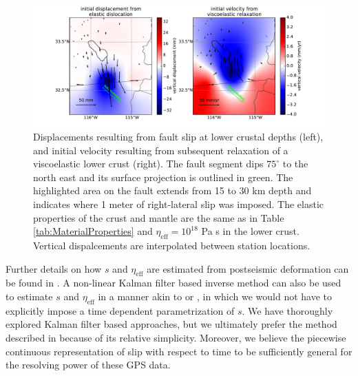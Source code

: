 \documentclass[review]{elsarticle}
\begin{document}
\begin{figure}
\includegraphics[scale=0.5]{Figures/Cancellation}
\caption{Displacements resulting from fault slip at lower crustal depths (left), and initial velocity resulting from subsequent relaxation of a viscoelastic lower crust (right).  The fault segment dips $75^\circ$ to the north east and its surface projection is outlined in green.  The highlighted area on the fault extends from 15 to 30 km depth and indicates where 1 meter of right-lateral slip was imposed.  The elastic properties of the crust and mantle are the same as in Table \ref{tab:MaterialProperties} and $\eta_\mathrm{eff}=10^{18}$ Pa s in the lower crust.  Vertical dispalcements are interpolated between station locations.}
\label{fig:LowerCrust}
\end{figure}
 
Further details on how $s$ and $\eta_\mathrm{eff}$ are estimated from postseismic deformation can be found in \citet{Hines2016}. A non-linear Kalman filter based inverse method can also be used to estimate $s$ and $\eta_{\mathrm{eff}}$ in a manner akin to \citet{Segall1997} or \citet{McGuire2003}, in which we would not have to explicitly impose a time dependent parametrization of $s$. We have thoroughly explored Kalman filter based approaches, but we ultimately prefer the method described in \citet{Hines2016} because of its relative simplicity. Moreover, we believe the piecewise continuous representation of slip with respect to time to be sufficiently general for the resolving power of these GPS data.
\end{document}
